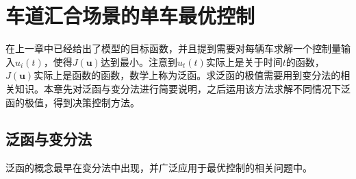\chapter{车道汇合场景的单车最优控制}
\label{cha:solve}

在上一章中已经给出了模型的目标函数，并且提到需要对每辆车求解一个控制量输入$u_i(t)$，使得$J(\bm{u})$达到最小。注意到$u_t(t)$实际上是关于时间$t$的函数，$J(\bm{u})$实际上是函数的函数，数学上称为泛函。求泛函的极值需要用到变分法的相关知识。本章先对泛函与变分法进行简要说明，之后运用该方法求解不同情况下泛函的极值，得到决策控制方法。

\section{泛函与变分法}
泛函的概念最早在变分法中出现，并广泛应用于最优控制的相关问题中。

